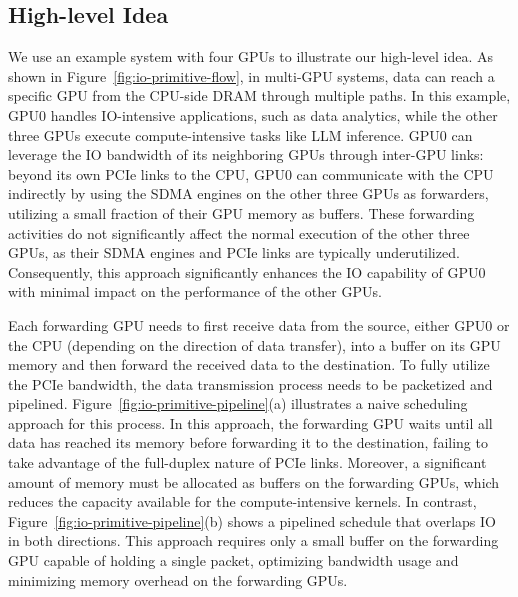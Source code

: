 \subsection{\textbf{High-level Idea}} \label{sec:io-high-level}
We use an example system with four GPUs to illustrate our high-level idea.
As shown in Figure~\ref{fig:io-primitive-flow}, in multi-GPU systems, data can reach a specific GPU from the CPU-side DRAM through multiple paths. 
In this example, GPU0 handles IO-intensive applications, such as data analytics, while the other three GPUs execute compute-intensive tasks like LLM inference.
GPU0 can leverage the IO bandwidth of its neighboring GPUs through inter-GPU links:
beyond its own PCIe links to the CPU, GPU0 can communicate with the CPU indirectly by using the SDMA engines on the other three GPUs as forwarders, utilizing a small fraction of their GPU memory as buffers. 
These forwarding activities do not significantly affect the normal execution of the other three GPUs, as their SDMA engines and PCIe links are typically underutilized. 
Consequently, this approach significantly enhances the IO capability of GPU0 with minimal impact on the performance of the other GPUs.

Each forwarding GPU needs to first receive data from the source, either GPU0 or the CPU (depending on the direction of data transfer), into a buffer on its GPU memory and then forward the received data to the destination. 
To fully utilize the PCIe bandwidth, the data transmission process needs to be packetized and pipelined.
Figure~\ref{fig:io-primitive-pipeline}(a) illustrates a naive scheduling approach for this process. 
In this approach, the forwarding GPU waits until all data has reached its memory before forwarding it to the destination, failing to take advantage of the full-duplex nature of PCIe links. 
Moreover, a significant amount of memory must be allocated as buffers on the forwarding GPUs, which reduces the capacity available for the compute-intensive kernels.
In contrast, Figure~\ref{fig:io-primitive-pipeline}(b) shows a pipelined schedule that overlaps IO in both directions. 
This approach requires only a small buffer on the forwarding GPU capable of holding a single packet, optimizing bandwidth usage and minimizing memory overhead on the forwarding GPUs.

